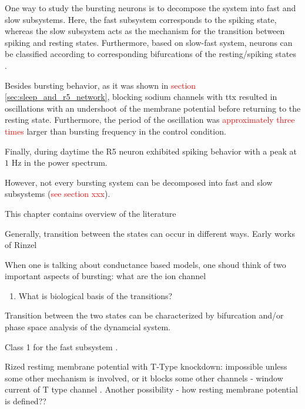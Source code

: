 \documentclass[../main.tex]{subfiles}
\begin{document}
One way to study the bursting neurons is to decompose the system into fast and
slow subsystems. Here, the fast subsystem corresponds to the spiking state, whereas the slow
subsystem acts as the mechanism for the transition between spiking and resting states.
Furthermore, based on slow-fast system, neurons can be classified according to
corresponding bifurcations of the resting/spiking states
\cite{izhikevichNEURALEXCITABILITYSPIKING2000,izhikevichDynamicalSystemsNeuroscience2006}.

Besides bursting behavior, as it was shown in \textcolor{red}{section \ref{sec:sleep_and_r5_network}},
blocking sodium channels with \gls{ttx} resulted in oscillations with an undershoot of the
membrane potential before returning to the resting state. Furthermore, the period of the
oscillation was \textcolor{red}{approximately three times} larger than bursting frequency
in the control condition.

Finally, during daytime the R5 neuron exhibited spiking behavior with a peak at $1$ Hz in
the power spectrum.

However, not every bursting system can be decomposed into fast and slow subsystems
(\textcolor{red}{see section xxx}).

This chapter contains overview of the literature


Generally, transition between the states can occur in different ways. Early works of
Rinzel 

When one is talking about conductance based models, one shoud think of two important
aspects of bursting: what are the ion channel 

\begin{enumerate}
    \item What is biological basis of the transitions?
\end{enumerate}

Transition between the two states can be characterized by bifurcation
and/or phase space analysis of the dynamcial system.




\color{red}
Class 1 for the fast subsystem \cite{liuSleepDriveEncoded2016}.

Rized restimg membrane potential with T-Type knockdown: impossible unless some
other mechanism is involved, or it blocks some other channels
- window current of T type channel \cite{amarilloInterplaySevenSubthreshold2014}.
Another possibility - how resting membrane potential is defined??
\end{document}
